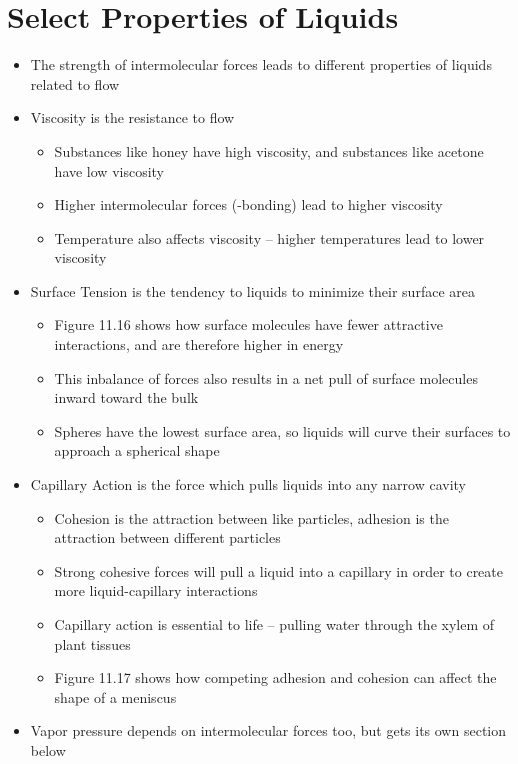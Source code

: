 \documentclass[12pt, openany, letterpaper]{memoir}
\begin{document}
\section{Select Properties of Liquids}
\begin{itemize}
	\item The strength of intermolecular forces leads to different properties of liquids related to flow
	\item Viscosity is the resistance to flow
	\begin{itemize}
		\item Substances like honey have high viscosity, and substances like acetone have low viscosity
		\item Higher intermolecular forces (-bonding) lead to higher viscosity
		\item Temperature also affects viscosity -- higher temperatures lead to lower viscosity
	\end{itemize}
	\item Surface Tension is the tendency to liquids to minimize their surface area
	\begin{itemize}
		\item Figure 11.16 shows how surface molecules have fewer attractive interactions, and are therefore higher in energy
    \item This inbalance of forces also results in a net pull of surface molecules inward toward the bulk
		\item Spheres have the lowest surface area, so liquids will curve their surfaces to approach a spherical shape
	\end{itemize}
	\item Capillary Action is the force which pulls liquids into any narrow cavity
	\begin{itemize}
		\item Cohesion is the attraction between like particles, adhesion is the attraction between different particles
		\item Strong cohesive forces will pull a liquid into a capillary in order to create more liquid-capillary interactions
		\item Capillary action is essential to life -- pulling water through the xylem of plant tissues
		\item Figure 11.17 shows how competing adhesion and cohesion can affect the shape of a meniscus
	\end{itemize}
	\item Vapor pressure depends on intermolecular forces too, but gets its own section below
\end{itemize}
\end{document}
